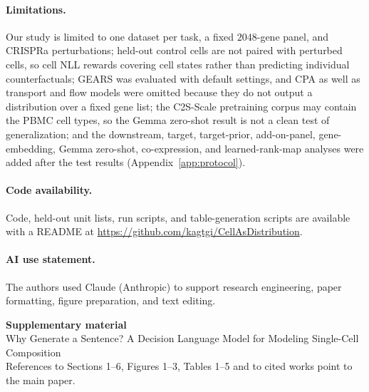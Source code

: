 \documentclass[10pt]{article}
\begin{document}
\paragraph{Limitations.}
Our study is limited to one dataset per task, a fixed $2048$-gene panel, and CRISPRa perturbations; held-out control cells are not paired with perturbed cells, so cell NLL rewards covering cell states rather than predicting individual counterfactuals; GEARS was evaluated with default settings, and CPA as well as transport and flow models were omitted because they do not output a distribution over a fixed gene list; the C2S-Scale pretraining corpus may contain the PBMC cell types, so the Gemma zero-shot result is not a clean test of generalization; and the downstream, target, target-prior, add-on-panel, gene-embedding, Gemma zero-shot, co-expression, and learned-rank-map analyses were added after the test results (Appendix~\ref{app:protocol}).

\paragraph{Code availability.} Code, held-out unit lists, run scripts, and table-generation scripts are available with a README at \url{https://github.com/kagtgi/CellAsDistribution}.
\paragraph{AI use statement.} The authors used Claude (Anthropic) to support research engineering, paper formatting, figure preparation, and text editing.

{

}
\clearpage
\appendix
\setcounter{page}{1}
\setcounter{figure}{0}
\setcounter{table}{0}
\begin{center}{\large\bfseries Supplementary material}\\[2pt]Why Generate a Sentence? A Decision Language Model for Modeling Single-Cell Composition\\[4pt]
{\small References to Sections 1--6, Figures 1--3, Tables 1--5 and to cited works point to the main paper.}\end{center}
\end{document}
